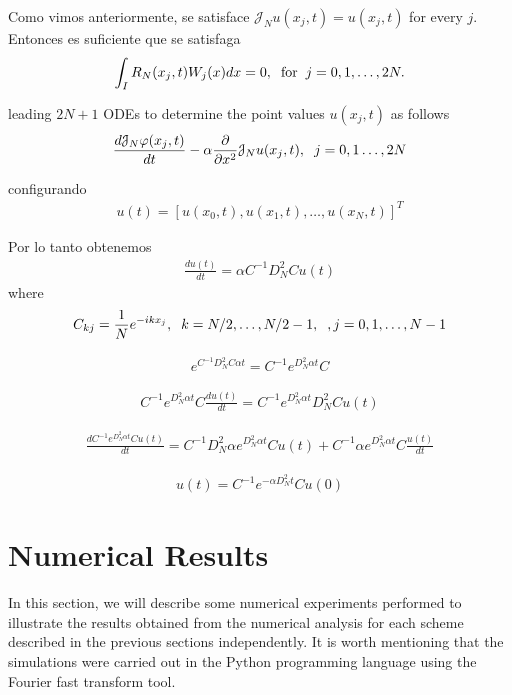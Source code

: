 	Como vimos anteriormente, se satisface $\mathcal{J}_N u(x_j, t) = u(x_j, t)$ for every $j$. Entonces es suficiente que se satisfaga
	\begin{align*}
		\int_{I} R_N (x_j, t) W_j (x) dx = 0, \hspace{2mm} \text{for} \hspace{2mm} j = 0, 1, \dots, 2N.
	\end{align*}
	
	leading $2N+1$ ODEs to determine the point values $u (x_j, t)$ as follows
	\begin{align*}
		\frac{d \mathcal{J}_N \varphi (x_j, t)}{dt} - \alpha \frac{\partial}{\partial x^2} \mathcal{J}_N u(x_j, t), \hspace{2mm} j = 0, 1 \dots, 2N
	\end{align*}
	
	configurando
	\begin{align*}
		u(t) = \left[ u(x_0, t), u(x_1, t), \dots, u(x_N, t) \right]^T
	\end{align*}  
	
	Por lo tanto obtenemos
	\begin{align*}
		\frac{d u(t) }{dt} = \alpha  C^{-1} D^2_N C u(t)
	\end{align*}
	where 
	\begin{align*}
		C_{kj} = \frac{1}{N} e^{-ikx_j}, \hspace{2mm} k = N/2, \dots, N/2 - 1, \hspace{2mm}, j = 0, 1, \dots, N -1
	\end{align*}

	\begin{align*}
		e^{C^{-1} D^2_N C \alpha t} = C^{-1} e^{D^2_N \alpha t} C
	\end{align*}

	\begin{align*}
		C^{-1} e^{D^2_N \alpha t} C \frac{d u(t) }{dt} = C^{-1} e^{D^2_N \alpha t} D^2_N C u(t)
	\end{align*}

	\begin{align*}
		\frac{d C^{-1} e^{D^2_N \alpha t} C u(t) }{dt} = C^{-1} D^2_N \alpha e^{D^2_N \alpha t} C u(t) + C^{-1} \alpha e^{D^2_N \alpha t} C  \frac{u(t)}{dt} 
	\end{align*}
	
	\begin{align*}
		u(t) = C^{-1} e^{-\alpha D^2_N t} C u(0)
	\end{align*}
	
	\section{Numerical Results}
		In this section, we will describe some numerical experiments performed to illustrate the results obtained from the numerical analysis for each scheme described in the previous sections independently. It is worth mentioning that the simulations were carried out in the Python programming language using the Fourier fast transform tool.
		
